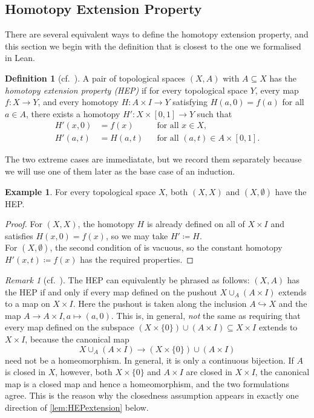 \documentclass[11pt, a4paper, english]{article}
\theoremstyle{plain}
\theoremstyle{definition}
\newtheorem{definition}[theorem]{Definition}
\newtheorem{example}[theorem]{Example}
\theoremstyle{remark}
\newtheorem{remark}[theorem]{Remark}
\numberwithin{equation}{section}
\numberwithin{theorem}{section}
\begin{document}
\subsection{Homotopy Extension Property} \label{subsec:HEP}

There are several equivalent ways to define the homotopy extension property, and this section we begin with the definition that is closest to the one we formalised in Lean.

\begin{definition} [cf.\ {\cite[Bemerkung~1]{WAL}}] \label{def:HEP}
A pair of topological spaces $(X,A)$ with $A \subseteq X$ has the \emph{homotopy extension property (HEP)} if for every topological space $Y$, every map $f \colon X \to Y$, and every homotopy $H \colon A \times I \to Y$ satisfying $H(a,0) = f(a)$ for all $a \in A$, there exists a homotopy $H' \colon X \times [0,1] \to Y$ such that
\begin{align*}
    H'(x,0) &= f(x)    && \text{for all } x \in X, \\
    H'(a,t) &= H(a,t)  && \text{for all } (a,t) \in A \times [0,1].
\end{align*}
\end{definition}
The two extreme cases are immediatate, but we record them separately because we will use one of them later as the base case of an induction.

\begin{example} \label{example:HEPtrivial} 
     For every topological space $X$, both $(X,X)$ and $(X,\emptyset)$ have the HEP.
\end{example}
\begin{proof}
    For $(X,X)$, the homotopy $H$ is already defined on all of $X \times I$ and satisfies $H(x,0) = f(x)$, so we may take $H' \coloneqq H$. \\ 
    For $(X,\emptyset)$, the second condition of  is vacuous, so the constant homotopy $H'(x,t) \coloneqq f(x)$ has the required properties.
\end{proof}

\begin{remark} [cf.\ {\cite[Bemerkung~2 und 3]{WAL}}] \label{rem:pushout}
    The HEP can equivalently be phrased as follows: $(X,A)$ has the HEP if and only if every map defined on the pushout $X \cup_A (A \times I)$ extends to a map on $X \times I$. Here the pushout is taken along the inclusion $A \hookrightarrow X$ and the map $A \to A \times I, a \mapsto (a,0)$. This is, in general, \emph{not} the same as requiring that every map defined on the subspace $(X \times \{0\}) \cup (A \times I) \subseteq X \times I$ extends to $X \times I$, because the canonical map
\[
    X \cup_A (A \times I) \to (X \times \{0\}) \cup (A \times I)
\]
need not be a homeomorphism. In general, it is only a continuous bijection. If $A$ is closed in $X$, however, both $X \times \{0\}$ and $A \times I$ are closed in $X \times I$, the canonical map is a closed map and hence a homeomorphism, and the two formulations agree. This is the reason why the closedness assumption appears in exactly one direction of \cref{lem:HEPextension} below. 
\end{remark}
\end{document}
